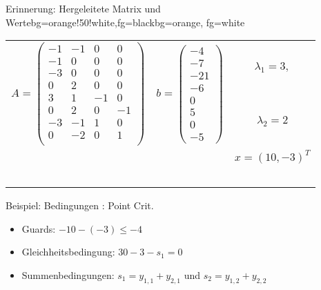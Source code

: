 \begin{frame}
	\begin{variableblock}{Erinnerung: Hergeleitete Matrix und Werte}{bg=orange!50!white,fg=black}{bg=orange, fg=white}
		\begin{tabular}{llc}
			\multirow{2}{*}{$A=\begin{pmatrix}
				-1 		& -1 		&  0		& 0		 \\
				-1 		& 0 		&  0		& 0		 \\
				-3 		& 0 		&  0		& 0		 \\
				0 		& 2 		&  0		& 0		 \\
				3 		& 1 		&  -1		& 0		 \\
				0 		& 2 		&  0		& -1	 \\
				-3 		& -1 		&  1		& 0		 \\
				0 		& -2 		&  0		& 1	 	 \\
				\end{pmatrix}$}&\multirow{2}{*}{$ b=\begin{pmatrix}
				-4 \\ -7 \\ -21 \\ -6 \\ 0 \\ 5 \\ 0 \\ -5
				\end{pmatrix} $}& $\lambda_1 = 3,$ \\
			& &  $\lambda_2 = 2$\\
			& & $x=(10, -3)^T$ \\
			& & \\
			& & \\
			& & \\
			& & \\
			& & \\
		\end{tabular}
	\end{variableblock}
	\begin{exampleblock}{Beispiel: Bedingungen : Point Crit.}
		\begin{itemize}
			\item Guards: $-10-(-3)\le-4$
			\item Gleichheitsbedingung: $30-3-s_1=0$
			\item Summenbedingungen: $s_1= y_{1,1}+y_{2,1}$ und $s_2=y_{1,2}+y_{2,2}$
		\end{itemize}
	\end{exampleblock}	
\end{frame}

